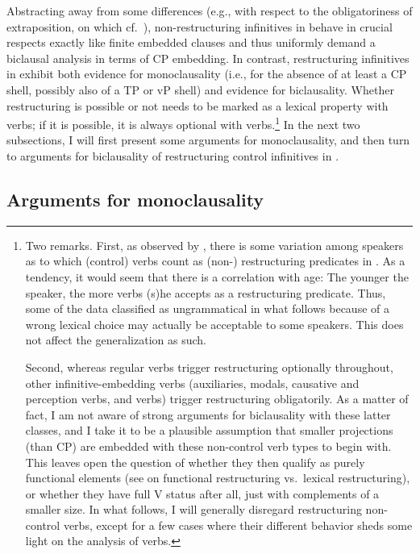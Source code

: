 \documentclass[output=paper]{langsci/langscibook}
\begin{document}
Abstracting away from some differences (e.g., with respect to the
obligatoriness of extraposition, on which cf.\ \citealt{BibHolRob2014}),
non-restructuring  infinitives in  behave in crucial respects
exactly like finite embedded clauses and thus uniformly demand a biclausal
analysis in terms of CP embedding.  In contrast, restructuring 
infinitives in  exhibit both evidence for monoclausality (i.e., for the
absence of at least a CP shell, possibly also of a TP or vP shell) and evidence
for biclausality. Whether restructuring is possible or not needs to be marked
as a lexical property with  verbs; if it is possible, it is always
optional with  verbs.\footnote{Two remarks. First, as observed by
    \cite{Fanselow:89:coh,Fanselow:91}, there is some variation among speakers
    as to which (control) verbs count as \mbox{(non-)} restructuring predicates
    in . As a tendency, it would seem that there is a correlation with
    age: The younger the speaker, the more verbs (s)he accepts as a
    restructuring predicate. Thus, some of the data classified as ungrammatical
    in what follows because of a wrong lexical choice may actually be
    acceptable to some speakers. This does not affect the generalization as
    such.

Second, whereas regular  verbs trigger restructuring optionally
throughout, other infinitive-embedding verbs (auxiliaries, modals, causative
and perception verbs, and  verbs) trigger restructuring obligatorily. As
a matter of fact, I am not aware of strong arguments for biclausality with
these latter classes, and I take it to be a plausible assumption that smaller
projections (than CP) are embedded with these non-control verb types to begin
with. This leaves open the question of whether they then qualify as purely
functional elements (see \citealt{Wurmbrand:01,Wurmbrand:04} on functional
restructuring vs.\ lexical restructuring), or whether they have full V status
after all, just with complements of a smaller size. In what follows, I will
generally disregard restructuring non-control verbs, except for a few cases
where their different behavior sheds some light on the analysis of 
verbs.} In the next two subsections, I will first present some arguments for
monoclausality, and then turn to arguments for biclausality of restructuring
control infinitives in .

\subsection{Arguments for monoclausality}\label{sec:32.2.1}
\end{document}
